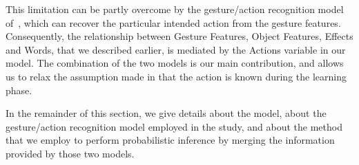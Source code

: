 This limitation can be partly overcome by the gesture/action recognition model of~\cite{saponaro:2013:crhri}, which can recover the particular intended action from the gesture features.
Consequently, the relationship between Gesture Features, Object Features, Effects and Words, that we described earlier, is mediated by the Actions variable in our model.
The combination of the two models is our main contribution, and allows us to relax the assumption made in \cite{salvi:2012:smcb} that the action is known during the learning phase.

In the remainder of this section, we give details about the \affwords{} model, about the gesture/action recognition model employed in the study, and about the method that we employ to perform probabilistic inference by merging the information provided by those two models.





